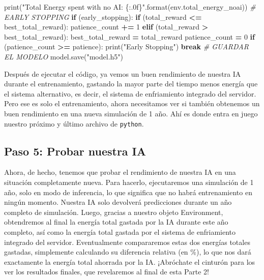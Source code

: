 \documentclass[]{book}
\newenvironment{Shaded}{\begin{snugshade}}{\end{snugshade}}
\newcommand{\BuiltInTok}[1]{#1}
\newcommand{\CommentTok}[1]{\textcolor[rgb]{0.56,0.35,0.01}{\textit{#1}}}
\newcommand{\ControlFlowTok}[1]{\textcolor[rgb]{0.13,0.29,0.53}{\textbf{#1}}}
\newcommand{\DecValTok}[1]{\textcolor[rgb]{0.00,0.00,0.81}{#1}}
\newcommand{\NormalTok}[1]{#1}
\newcommand{\OperatorTok}[1]{\textcolor[rgb]{0.81,0.36,0.00}{\textbf{#1}}}
\newcommand{\SpecialCharTok}[1]{\textcolor[rgb]{0.00,0.00,0.00}{#1}}
\newcommand{\StringTok}[1]{\textcolor[rgb]{0.31,0.60,0.02}{#1}}
\begin{document}
\begin{Shaded}
\begin{Highlighting}[]
        \BuiltInTok{print}\NormalTok{(}\StringTok{"Total Energy spent with no AI: }\SpecialCharTok{\{:.0f\}}\StringTok{"}\NormalTok{.}\BuiltInTok{format}\NormalTok{(env.total_energy_noai))}
        \CommentTok{# EARLY STOPPING}
        \ControlFlowTok{if}\NormalTok{ (early_stopping):}
            \ControlFlowTok{if}\NormalTok{ (total_reward }\OperatorTok{<=}\NormalTok{ best_total_reward):}
\NormalTok{                patience_count }\OperatorTok{+=} \DecValTok{1}
            \ControlFlowTok{elif}\NormalTok{ (total_reward }\OperatorTok{>}\NormalTok{ best_total_reward):}
\NormalTok{                best_total_reward }\OperatorTok{=}\NormalTok{ total_reward}
\NormalTok{                patience_count }\OperatorTok{=} \DecValTok{0}
            \ControlFlowTok{if}\NormalTok{ (patience_count }\OperatorTok{>=}\NormalTok{ patience):}
                \BuiltInTok{print}\NormalTok{(}\StringTok{"Early Stopping"}\NormalTok{)}
                \ControlFlowTok{break}
        \CommentTok{# GUARDAR EL MODELO}
\NormalTok{        model.save(}\StringTok{"model.h5"}\NormalTok{)}
\end{Highlighting}
\end{Shaded}

Después de ejecutar el código, ya vemos un buen rendimiento de nuestra IA durante el entrenamiento, gastando la mayor parte del tiempo menos energía que el sistema alternativo, es decir, el sistema de enfriamiento integrado del servidor. Pero ese es solo el entrenamiento, ahora necesitamos ver si también obtenemos un buen rendimiento en una nueva simulación de 1 año. Ahí es donde entra en juego nuestro próximo y último archivo de \texttt{python}.

\hypertarget{paso-5-probar-nuestra-ia}{%
\subsection{Paso 5: Probar nuestra IA}\label{paso-5-probar-nuestra-ia}}

Ahora, de hecho, tenemos que probar el rendimiento de nuestra IA en una situación completamente nueva. Para hacerlo, ejecutaremos una simulación de 1 año, solo en modo de inferencia, lo que significa que no habrá entrenamiento en ningún momento. Nuestra IA solo devolverá predicciones durante un año completo de simulación. Luego, gracias a nuestro objeto Environment, obtendremos al final la energía total gastada por la IA durante este año completo, así como la energía total gastada por el sistema de enfriamiento integrado del servidor. Eventualmente compararemos estas dos energías totales gastadas, simplemente calculando su diferencia relativa (en \%), lo que nos dará exactamente la energía total ahorrada por la IA. ¡Abróchate el cinturón para los ver los resultados finales, que revelaremos al final de esta Parte 2!
\end{document}
